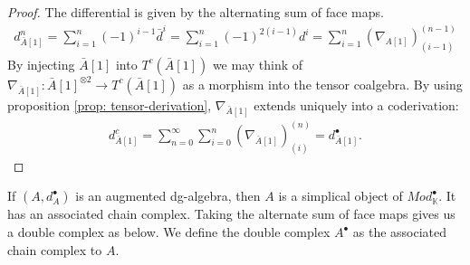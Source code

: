 \documentclass[../thesis.tex]{subfiles}
\begin{document}
            \begin{proof}
                The differential is given by the alternating sum of face maps.
                \begin{align*}
                    d_{\bar{A}[1]}^n = \sum_{i=1}^n (-1)^{i-1}\bar{d}^i = \sum_{i=1}^n (-1)^{2(i-1)}d^i = \sum_{i=1}^n (\nabla_{A[1]})_{(i-1)}^{(n-1)}
                \end{align*}
                By injecting $\bar{A}[1]$ into $T^c(\bar{A}[1])$ we may think of $\nabla_{\bar{A}[1]} : \bar{A}[1]^{\otimes 2} \rightarrow T^c(\bar{A}[1])$ as a morphism into the tensor coalgebra. By using proposition \ref{prop: tensor-derivation}, $\nabla_{\bar{A}[1]}$ extends uniquely into a coderivation:
                \begin{align*}
                    d_{\bar{A}[1]}^c = \sum_{n=0}^{\infty}\sum_{i=0}^n(\nabla_{\bar{A}[1]})_{(i)}^{(n)} = d_{\bar{A}[1]}^\bullet\text{.}
                \end{align*}
            \end{proof}

            If $(A, d_A^\bullet)$ is an augmented dg-algebra, then $A$ is a simplical object of $Mod_\mathbb{K}^\bullet$. It has an associated chain complex. Taking the alternate sum of face maps gives us a double complex as below. We define the double complex $A^\bullet$ as the associated chain complex to $A$.
            \begin{center}
            \end{center}
        
\end{document}
